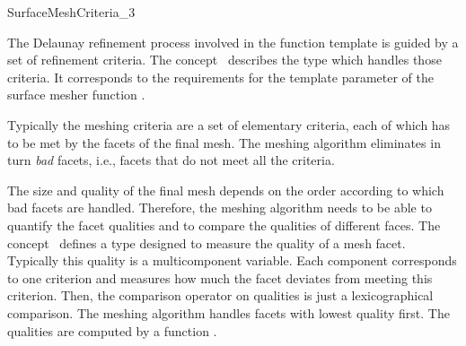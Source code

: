 

\begin{ccRefConcept}{SurfaceMeshCriteria_3}

\ccDefinition
  
The Delaunay refinement process involved in  the 
function template  
is guided by a set of refinement criteria.
The concept \ccRefName\ describes the type  which
handles those criteria. 
It corresponds to the requirements for the template parameter
 of the surface mesher function
.

Typically the meshing criteria are a set
of elementary criteria, each of which
has to be met by  the facets of the final mesh.
The meshing algorithm eliminates in turn  {\em bad} facets, i.e.,
facets that do not meet all the criteria.

The size and quality of the final mesh 
depends on the order according to which bad facets
are handled. Therefore, the meshing algorithm 
needs to be able to quantify the facet qualities and to compare
the qualities of different faces.
The concept \ccRefName\ 
defines a type  designed to measure
the quality of a mesh facet. 
Typically this quality
is a multicomponent variable.  Each component corresponds to
one criterion and measures how much the facet deviates from
meeting this criterion. Then, the  comparison operator on qualities
is just a lexicographical comparison. The meshing algorithm handles facets
with lowest quality first. The qualities are computed by a function
\ccc{is_bad(Facet f, Quality& q)}.

\ccTypes



\end{ccRefConcept}

